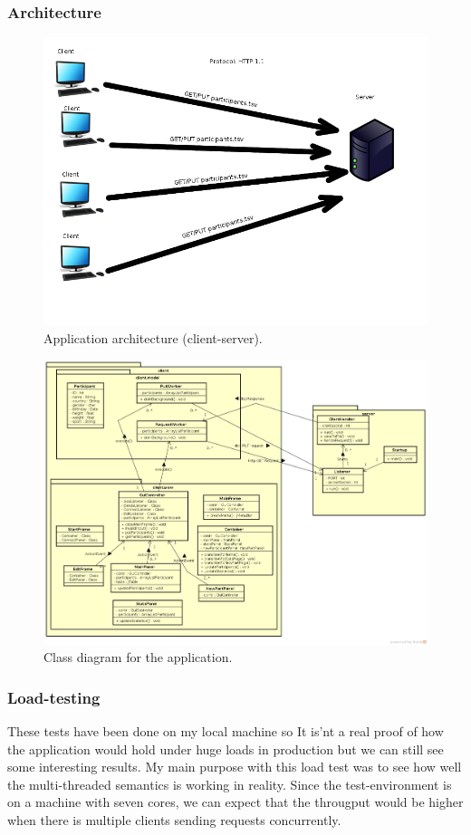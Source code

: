 \documentclass[a4paper, 11pt]{article}
\begin{document}
\subsubsection{Architecture}
\begin{figure}[H]
\includegraphics[scale=0.50]{http_architecture.png}
\caption{Application architecture (client-server).}
\end{figure}
\begin{figure}[H]
\includegraphics[scale=0.35]{assignment1_architecture.png}
\caption{Class diagram for the application.}
\end{figure}
\subsubsection{Load-testing}
These tests have been done on my local machine so It is'nt a real proof of how the application would hold under huge loads in production but we can still see some interesting results.
My main purpose with this load test was to see how well the multi-threaded semantics is working in reality. Since the test-environment is on a machine with seven cores, we can expect that the througput would be higher when there is multiple clients sending requests concurrently. 
\end{document}
